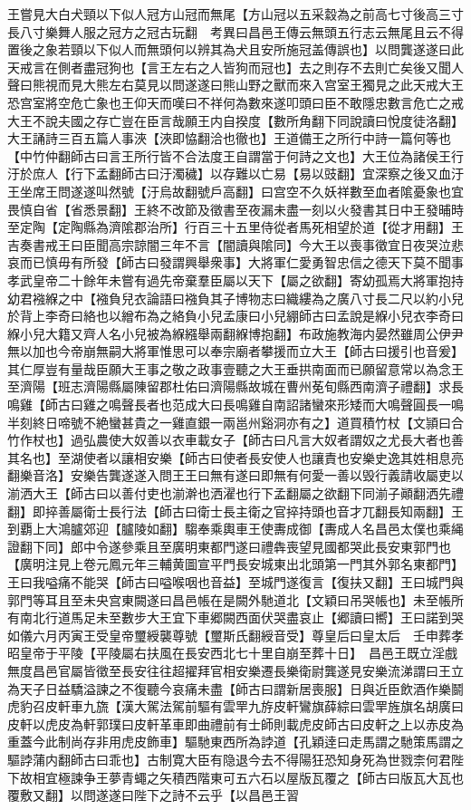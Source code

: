王嘗見大白犬頸以下似人冠方山冠而無尾【方山冠以五采縠為之前高七寸後高三寸長八寸樂舞人服之冠方之冠古玩翻　考異曰昌邑王傳云無頭五行志云無尾且云不得置後之象若頸以下似人而無頭何以辨其為犬且安所施冠盖傳誤也】以問龔遂遂曰此天戒言在側者盡冠狗也【言王左右之人皆狗而冠也】去之則存不去則亡矣後又聞人聲曰熊視而見大熊左右莫見以問遂遂曰熊山野之獸而來入宫室王獨見之此天戒大王恐宫室將空危亡象也王仰天而嘆曰不祥何為數來遂叩頭曰臣不敢隱忠數言危亡之戒大王不說夫國之存亡豈在臣言哉願王内自揆度【數所角翻下同說讀曰悅度徒洛翻】大王誦詩三百五篇人事浹【浹即恊翻洽也徹也】王道備王之所行中詩一篇何等也【中竹仲翻師古曰言王所行皆不合法度王自謂當于何詩之文也】大王位為諸侯王行汙於庶人【行下孟翻師古曰汙濁穢】以存難以亡易【易以豉翻】宜深察之後又血汙王坐席王問遂遂叫然號【汙烏故翻號戶高翻】曰宫空不久妖祥數至血者隂憂象也宜畏慎自省【省悉景翻】王終不改節及徵書至夜漏未盡一刻以火發書其日中王發晡時至定陶【定陶縣為濟隂郡治所】行百三十五里侍從者馬死相望於道【從才用翻】王吉奏書戒王曰臣聞高宗諒闇三年不言【闇讀與隂同】今大王以喪事徵宜日夜哭泣悲哀而已慎毋有所發【師古曰發謂興舉衆事】大將軍仁愛勇智忠信之德天下莫不聞事孝武皇帝二十餘年未嘗有過先帝棄羣臣屬以天下【屬之欲翻】寄幼孤焉大將軍抱持幼君襁緥之中【襁負兒衣論語曰襁負其子博物志曰織縷為之廣八寸長二尺以約小兒於背上李奇曰絡也以繒布為之絡負小兒孟康曰小兒綳師古曰孟說是緥小兒衣李奇曰緥小兒大籍又齊人名小兒被為緥繦舉兩翻緥博抱翻】布政施教海内晏然雖周公伊尹無以加也今帝崩無嗣大將軍惟思可以奉宗廟者攀援而立大王【師古曰援引也音爰】其仁厚豈有量哉臣願大王事之敬之政事壹聽之大王垂拱南面而已願留意常以為念王至濟陽【班志濟陽縣屬陳留郡杜佑曰濟陽縣故城在曹州莬旬縣西南濟子禮翻】求長鳴雞【師古曰雞之鳴聲長者也范成大曰長鳴雞自南詔諸蠻來形矮而大鳴聲圓長一鳴半刻終日啼號不絶蠻甚貴之一雞直銀一兩邕州谿洞亦有之】道買積竹杖【文頴曰合竹作杖也】過弘農使大奴善以衣車載女子【師古曰凡言大奴者謂奴之尤長大者也善其名也】至湖使者以讓相安樂【師古曰使者長安使人也讓責也安樂史逸其姓相息亮翻樂音洛】安樂告龔遂遂入問王王曰無有遂曰即無有何愛一善以毁行義請收屬吏以湔洒大王【師古曰以善付吏也湔澣也洒濯也行下孟翻屬之欲翻下同湔子顚翻洒先禮翻】即捽善屬衛士長行法【師古曰衛士長主衛之官捽持頭也音才兀翻長知兩翻】王到覇上大鴻臚郊迎【臚陵如翻】騶奉乘輿車王使夀成御【夀成人名昌邑太僕也乘䋲證翻下同】郎中令遂參乘且至廣明東都門遂曰禮犇喪望見國都哭此長安東郭門也【廣明注見上卷元鳳元年三輔黄圖宣平門長安城東出北頭第一門其外郭名東都門】王曰我嗌痛不能哭【師古曰嗌喉咽也音益】至城門遂復言【復扶又翻】王曰城門與郭門等耳且至未央宫東闕遂曰昌邑帳在是闕外馳道北【文穎曰吊哭帳也】未至帳所有南北行道馬足未至數步大王宜下車郷闕西面伏哭盡哀止【郷讀曰嚮】王曰諾到哭如儀六月丙寅王受皇帝璽綬襲尊號【璽斯氏翻綬音受】尊皇后曰皇太后　壬申葬孝昭皇帝于平陵【平陵屬右扶風在長安西北七十里自崩至葬十日】　昌邑王既立淫戲無度昌邑官屬皆徵至長安往往超擢拜官相安樂遷長樂衛尉龔遂見安樂流涕謂曰王立為天子日益驕溢諫之不復聽今哀痛未盡【師古曰謂新居喪服】日與近臣飲酒作樂鬬虎豹召皮軒車九旒【漢大駕法駕前驅有雲䍐九斿皮軒鸞旗薛綜曰雲䍐旌旗名胡廣曰皮軒以虎皮為軒郭璞曰皮軒革車即曲禮前有士師則載虎皮師古曰皮軒之上以赤皮為重蓋今此制尚存非用虎皮飾車】驅馳東西所為誖道【孔穎逹曰走馬謂之馳策馬謂之驅誖蒲内翻師古曰乖也】古制寛大臣有隐退今去不得陽狂恐知身死為世戮柰何君陛下故相宜極諫争王夢青蠅之矢積西階東可五六石以屋版瓦覆之【師古曰版瓦大瓦也覆敷又翻】以問遂遂曰陛下之詩不云乎【以昌邑王習